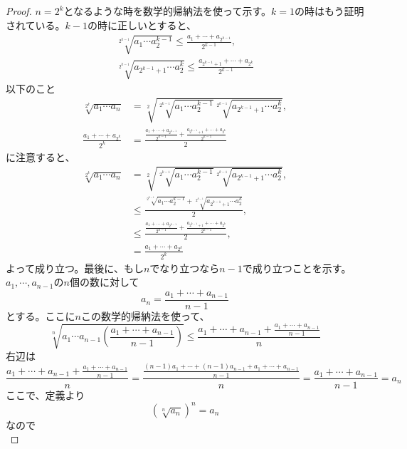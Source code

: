 \documentclass{ltjsarticle}
\begin{document}
\begin{proof}
$n=2^k$となるような時を数学的帰納法を使って示す。$k=1$の時はもう証明されている。$k-1$の時に正しいとすると、
\begin{align*}
\sqrt[2^{k-1}]{a_1\cdots a_2^{k-1}}\leq {\frac {a_1+\cdots+a_{2^{k-1}}} {2^{k-1}}},\\\sqrt[2^{k-1}]{a_{2^{k-1}+1}\cdots a_2^{k}}\leq {\frac {a_{2^{k-1}+1}+\cdots+a_{2^{k}}} {2^{k-1}}}
\end{align*}
以下のこと
\begin{align*}
\sqrt[2^k]{a_1\cdots a_n} &= \sqrt[2]{\sqrt[2^{k-1}]{a_1\cdots a_2^{k-1}}\sqrt[2^{k-1}]{a_{2^{k-1}+1}\cdots a_2^{k}}},\\
{\frac {a_1+\cdots +a_{2^k}} {2^k}} &= {\frac {{\frac {a_1+\cdots+a_{2^{k-1}}} {2^{k-1}}}+{\frac {a_{2^{k-1}+1}+\cdots+a_{2^{k}}} {2^{k-1}}}} 2}
\end{align*}
に注意すると、
\begin{align*}
\sqrt[2^k]{a_1\cdots a_n} &= \sqrt[2]{\sqrt[2^{k-1}]{a_1\cdots a_2^{k-1}}\sqrt[2^{k-1}]{a_{2^{k-1}+1}\cdots a_2^{k}}},\\
& \leq {\frac {\sqrt[2^{k-1}]{a_1\cdots a_2^{k-1}}+\sqrt[2^{k-1}]{a_{2^{k-1}+1}\cdots a_2^{k}}} 2},\\
& \leq {\frac {{\frac {a_1+\cdots+a_{2^{k-1}}} {2^{k-1}}}+{\frac {a_{2^{k-1}+1}+\cdots+a_{2^{k}}} {2^{k-1}}}} 2},\\
& = {\frac {a_1+\cdots +a_{2^k}} {2^k}} 
\end{align*}
よって成り立つ。最後に、もし$n$でなり立つなら$n-1$で成り立つことを示す。$a_1,\cdots,a_{n-1}$の$n$個の数に対して
\begin{equation*}
a_{n} = {\frac {a_1+\cdots+a_{n-1}} {n-1}}
\end{equation*}
とする。ここに$n$この数学的帰納法を使って、
\begin{equation*}
\sqrt[n]{a_1\cdots a_{n-1}\left({\frac {a_1+\cdots+a_{n-1}} {n-1}}\right)} \leq {\frac {a_1+\cdots+a_{n-1} +{\frac {a_1+\cdots+a_{n-1}} {n-1}}} {n}}
\end{equation*}
右辺は
\begin{equation*}
{\frac {a_1+\cdots+a_{n-1} +{\frac {a_1+\cdots+a_{n-1}} {n-1}}} {n}} ={\frac {{\frac {(n-1)a_1+\cdots+(n-1)a_{n-1}+a_1+\cdots+a_{n-1}} {n-1}}} {n}} = {\frac {a_1+\cdots+a_{n-1}} {n-1}}=a_n
\end{equation*}
ここで、定義より
\begin{equation*}
(\sqrt[n]{a_n})^n = a_n
\end{equation*}
なので
\begin{equation*}

\end{equation*}
\end{proof}
\end{document}

